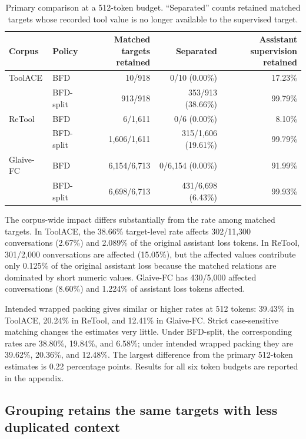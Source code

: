 \documentclass[pdflatex,sn-basic,Numbered]{sn-jnl}
\begin{document}
\begin{table}[t]
\centering
\small
\caption{
Primary comparison at a 512-token budget. ``Separated'' counts retained matched targets
whose recorded tool value is no longer available to the supervised target.
}
\label{tab:primary}
\begin{tabular}{llrrr}
\toprule
Corpus & Policy &
\shortstack{Matched targets\\retained} &
Separated &
\shortstack{Assistant supervision\\retained} \\
\midrule
ToolACE & BFD
& 10/918
& 0/10 (0.00\%)
& 17.23\% \\
& BFD-split
& 913/918
& 353/913 (38.66\%)
& 99.79\% \\
\addlinespace

ReTool & BFD
& 6/1,611
& 0/6 (0.00\%)
& 8.10\% \\
& BFD-split
& 1,606/1,611
& 315/1,606 (19.61\%)
& 99.79\% \\
\addlinespace

Glaive-FC & BFD
& 6,154/6,713
& 0/6,154 (0.00\%)
& 91.99\% \\
& BFD-split
& 6,698/6,713
& 431/6,698 (6.43\%)
& 99.93\% \\
\bottomrule
\end{tabular}
\end{table}

The corpus-wide impact differs substantially from the rate among matched targets. In ToolACE,
the 38.66\% target-level rate affects 302/11,300 conversations (2.67\%) and 2.089\% of the
original assistant loss tokens. In ReTool, 301/2,000 conversations are affected (15.05\%), but
the affected values contribute only 0.125\% of the original assistant loss because the matched
relations are dominated by short numeric values. Glaive-FC has 430/5,000 affected conversations
(8.60\%) and 1.224\% of assistant loss tokens affected.

Intended wrapped packing gives similar or higher rates at 512 tokens: 39.43\% in ToolACE,
20.24\% in ReTool, and 12.41\% in Glaive-FC. Strict case-sensitive matching changes the
estimates very little. Under BFD-split, the corresponding rates are 38.80\%, 19.84\%, and
6.58\%; under intended wrapped packing they are 39.62\%, 20.36\%, and 12.48\%. The largest
difference from the primary 512-token estimates is 0.22 percentage points. Results for all six
token budgets are reported in the appendix.


\subsection{Grouping retains the same targets with less duplicated context}
\label{sec:grouped_results}
\end{document}
